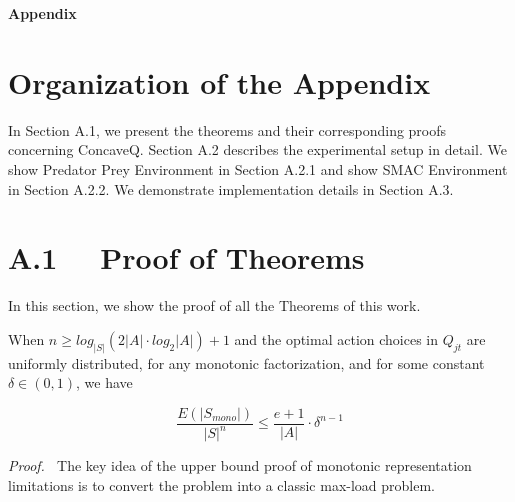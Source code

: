 \onecolumn

\begin{center}
 \Large\textbf{Appendix \\
}
\end{center}



\setcounter{section}{0}
\setcounter{theorem}{0}
\setcounter{equation}{0}
\setcounter{prop}{0}


\section{Organization of the Appendix}
In Section A.1, we present the theorems and their corresponding proofs concerning ConcaveQ. Section A.2 describes the experimental setup in detail. We show Predator Prey Environment in Section A.2.1 and show SMAC Environment in Section A.2.2.  We demonstrate implementation details in Section A.3.



\section{A.1 \ \ Proof of Theorems} \label{subsec:Theorems}
In this section, we show the proof of all the Theorems of this work.

\begin{theorem}
 When $n \geq log_{|S|}(2|A|\cdot log_2|A|) + 1$ and the optimal action choices in $Q_{jt}$ are uniformly distributed, for any monotonic factorization, and for some constant $\delta\in(0,1)$, we have

 \begin{equation}
     \frac{E(|S_{mono}|)}{|S|^n} \leq \frac{e+1}{|A|}\cdot \delta^{n-1}
 \end{equation}

\end{theorem}


\noindent\textit{Proof. \ }The key idea of the upper bound proof of monotonic representation limitations is to convert the problem into a classic max-load problem.

